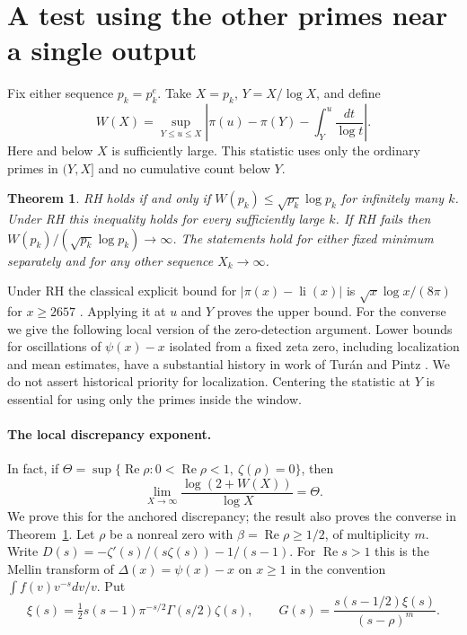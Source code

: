 \documentclass[11pt]{article}
\newtheorem{theorem}{Theorem}
\newcommand{\RR}{\operatorname{Re}}
\newcommand{\li}{\operatorname{li}}
\begin{document}
\section{A test using the other primes near a single output}
Fix either sequence $p_k=p_k^e$. Take $X=p_k$, $Y=X/\log X$, and define
\[
 W(X)=\sup_{Y\le u\le X}
 \left|\pi(u)-\pi(Y)-\int_Y^u\frac{dt}{\log t}\right|.
\]
Here and below $X$ is sufficiently large. This statistic uses only the ordinary primes in $(Y,X]$ and no cumulative count below $Y$.
\begin{theorem}\label{th:obs}
RH holds if and only if $W(p_k)\le \sqrt{p_k}\log p_k$ for infinitely many $k$. Under RH this inequality holds for every sufficiently large $k$. If RH fails then $W(p_k)/(\sqrt{p_k}\log p_k)\to\infty$. The statements hold for either fixed minimum separately and for any other sequence $X_k\to\infty$.
\end{theorem}
Under RH the classical explicit bound for $|\pi(x)-\li(x)|$ is $\sqrt{x}\log x/(8\pi)$ for $x\ge2657$ \cite{schoenfeld,dlmf}. Applying it at $u$ and $Y$ proves the upper bound. For the converse we give the following local version of the zero-detection argument. Lower bounds for oscillations of $\psi(x)-x$ isolated from a fixed zeta zero, including localization and mean estimates, have a substantial history in work of Tur\'an and Pintz \cite{pintz84,pintz22}. We do not assert historical priority for localization. Centering the statistic at $Y$ is essential for using only the primes inside the window.

\paragraph{The local discrepancy exponent.}
In fact, if $\Theta=\sup\{\RR\rho:0<\RR\rho<1,\ \zeta(\rho)=0\}$, then
\[
 \lim_{X\to\infty}\frac{\log(2+W(X))}{\log X}=\Theta .
\]
We prove this for the anchored discrepancy; the result also proves the converse in Theorem~\ref{th:obs}. Let $\rho$ be a nonreal zero with $\beta=\RR\rho\ge1/2$, of multiplicity $m$. Write $D(s)=-\zeta'(s)/(s\zeta(s))-1/(s-1)$. For $\RR s>1$ this is the Mellin transform of $\Delta(x)=\psi(x)-x$ on $x\ge1$ in the convention $\int f(v)v^{-s}dv/v$. Put
\[
 \xi(s)=\tfrac12s(s-1)\pi^{-s/2}\Gamma(s/2)\zeta(s),\qquad
 G(s)=\frac{s(s-1/2)\xi(s)}{(s-\rho)^m}.
\]
\end{document}
